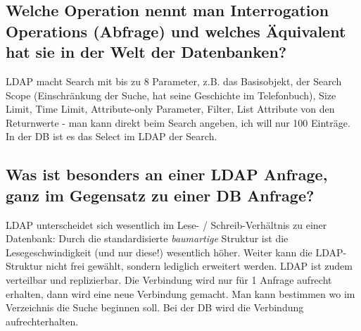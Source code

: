 \subsection{Welche Operation nennt man Interrogation Operations (Abfrage) und welches Äquivalent hat sie in der Welt der Datenbanken?}
LDAP macht Search mit bis zu 8 Parameter, z.B. das Basisobjekt, der Search Scope (Einschränkung der Suche, hat seine Geschichte im Telefonbuch), Size Limit, Time Limit, Attribute-only Parameter, Filter, List Attribute von den Returnwerte - man kann direkt beim Search angeben, ich will nur 100 Einträge. In der DB ist es das Select im LDAP der Search.

\subsection{Was ist besonders an einer LDAP Anfrage, ganz im Gegensatz zu einer DB Anfrage?}
LDAP unterscheidet sich wesentlich im Lese- / Schreib-Verhältnis zu einer Datenbank: Durch die standardisierte \textit{baumartige} Struktur ist die Lesegeschwindigkeit (und nur diese!) wesentlich höher. Weiter kann die LDAP-Struktur nicht frei gewählt, sondern lediglich erweitert werden. LDAP ist zudem verteilbar und replizierbar. Die Verbindung wird nur für 1 Anfrage aufrecht erhalten, dann wird eine neue Verbindung gemacht. Man kann bestimmen wo im Verzeichnis die Suche beginnen soll. Bei der DB wird die Verbindung aufrechterhalten.